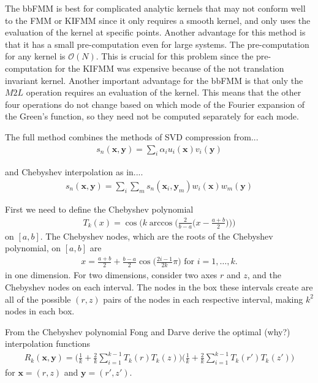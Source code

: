 \documentclass[11pt, oneside]{article}   	%
\begin{document}
The bbFMM is best for complicated analytic kernels that may not conform well to the FMM or KIFMM since it only requires a smooth kernel, and only uses the evaluation of the kernel at specific points. Another advantage for this method is that it has a small pre-computation even for large systems. The pre-computation for any kernel is $\mathcal{O}(N)$. This is crucial for this problem since the pre-computation for the KIFMM was expensive because of the not translation invariant kernel. Another important advantage for the bbFMM is that only the $M2L$ operation requires an evaluation of the kernel. This means that the other four operations do not change based on which mode of the Fourier expansion of the Green's function, so they need not be computed separately for each mode.

The full method combines the methods of SVD compression from...
\begin{align}
s_n(\mathbf{x},\mathbf{y})=\sum_i \alpha_i u_i(\mathbf{x})v_i(\mathbf{y})
\end{align}

and Chebyshev interpolation as in....
\begin{align}
s_n(\mathbf{x},\mathbf{y})=\sum_i\sum_m s_n(\mathbf{x}_i,\mathbf{y}_m)w_i(\mathbf{x})w_m(\mathbf{y})
\end{align}

First we need to define the Chebyshev polynomial
\begin{align}
T_k(x)=\cos\bigg(k\arccos\bigg(\frac{2}{b-a}\bigg(x-\frac{a+b}{2}\bigg)\bigg)\bigg)
\end{align}
on $[a,b]$. The Chebyshev nodes, which are the roots of the Chebyshev polynomial, on $[a,b]$ are
\begin{align}
x=\frac{a+b}{2}+\frac{b-a}{2}\cos\bigg(\frac{2i-1}{2k}\pi\bigg)\mbox{ for }i=1,\dots,k.
\end{align}
in one dimension. For two dimensions, consider two axes $r$ and $z$, and the Chebyshev nodes on each interval. The nodes in the box these intervals create are all of the possible $(r,z)$ pairs of the nodes in each respective interval, making $k^2$ nodes in each box.

From the Chebyshev polynomial Fong and Darve derive the optimal (why?) interpolation functions
\begin{align}
R_k(\mathbf{x},\mathbf{y}) = \bigg(\frac{1}{k} + \frac{2}{k}\sum_{i=1}^{k-1}T_k(r)T_k(z)\bigg)\bigg(\frac{1}{k} + \frac{2}{k}\sum_{i=1}^{k-1}T_k(r')T_k(z')\bigg)
\end{align}
for $\mathbf{x}=(r,z)$ and $\mathbf{y}=(r',z')$.
\end{document}
